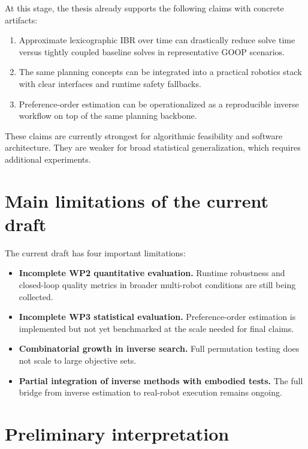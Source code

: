 At this stage, the thesis already supports the following claims with concrete
artifacts:

\begin{enumerate}
    \item Approximate lexicographic IBR over time can drastically reduce solve
    time versus tightly coupled baseline solves in representative GOOP scenarios.
    \item The same planning concepts can be integrated into a practical robotics
    stack with clear interfaces and runtime safety fallbacks.
    \item Preference-order estimation can be operationalized as a reproducible
    inverse workflow on top of the same planning backbone.
\end{enumerate}

These claims are currently strongest for algorithmic feasibility and software
architecture. They are weaker for broad statistical generalization, which
requires additional experiments.

\section{Main limitations of the current draft}

The current draft has four important limitations:

\begin{itemize}
    \item \textbf{Incomplete WP2 quantitative evaluation.} Runtime robustness and
    closed-loop quality metrics in broader multi-robot conditions are still being
    collected.
    \item \textbf{Incomplete WP3 statistical evaluation.} Preference-order
    estimation is implemented but not yet benchmarked at the scale needed for
    final claims.
    \item \textbf{Combinatorial growth in inverse search.} Full permutation
    testing does not scale to large objective sets.
    \item \textbf{Partial integration of inverse methods with embodied tests.}
    The full bridge from inverse estimation to real-robot execution remains
    ongoing.
\end{itemize}

\section{Preliminary interpretation}

